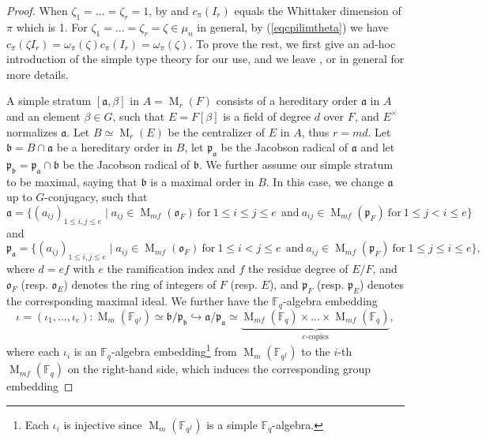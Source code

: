 \documentclass{amsart}
\numberwithin{equation}{section}
\newcommand{\mrm}{\operatorname{M}}
\newcommand{\mbf}{\mathbb{F}}
\newcommand{\mfp}{\mathfrak{p}}
\newcommand{\mfo}{\mathfrak{o}}
\newcommand{\mfa}{\mathfrak{a}}
\newcommand{\mfb}{\mathfrak{b}}
\begin{document}
		\begin{proof}
			
			When $\zeta_{1}=...=\zeta_{r}=1$, by \cite{rodier1975modele} and \cite{shalika1974multiplicity} $c_{\pi}(I_{r})$ equals the Whittaker dimension of $\pi$ which is 1. For $\zeta_{1}=...=\zeta_{r}=\zeta\in\mu_{n}$ in general, by (\ref{eqcpilimtheta}) we have $c_{\pi}(\zeta I_{r})=\omega_{\pi}(\zeta)c_{\pi}(I_{r})=\omega_{\pi}(\zeta)$. To prove the rest, we first give an ad-hoc introduction of the simple type theory for our use, and we leave \cite{bushnell2019arithmetic}, or in general \cite{bushnell129admissible} for more details.
			
			A simple stratum $[\mfa,\beta]$ in $A=\mrm_{r}(F)$ consists of a hereditary order $\mfa$ in $A$ and an element $\beta\in G$, such that $E=F[\beta]$ is a field of degree $d$ over $F$, and $E^{\times}$ normalizes $\mfa$. Let $B\simeq \mrm_{r}(E)$ be the centralizer of $E$ in $A$, thus $r=md$. Let $\mfb=B\cap\mfa$ be a hereditary order in $B$, let $\mfp_{\mfa}$ be the Jacobson radical of $\mfa$ and let $\mfp_{\mfb}=\mfp_{\mfa}\cap\mfb$ be the Jacobson radical of $\mfb$. We further assume our simple stratum to be maximal, saying that $\mfb$ is a maximal order in $B$. In this case, we change $\mfa$ up to $G$-conjugacy, such that $$\mfa=\{(a_{ij})_{1\leq i,j\leq e}\mid a_{ij}\in\mrm_{mf}(\mfo_{F})\ \text{for}\ 1\leq i\leq j\leq e\ \ \text{and}\ a_{ij}\in\mrm_{mf}(\mfp_{F})\ \text{for}\ 1\leq j< i\leq e \}$$
			and $$\mfp_{\mfa}=\{(a_{ij})_{1\leq i,j\leq e}\mid a_{ij}\in\mrm_{mf}(\mfo_{F})\ \text{for}\ 1\leq i< j\leq e\ \ \text{and}\ a_{ij}\in\mrm_{mf}(\mfp_{F})\ \text{for}\ 1\leq j\leq i\leq e \},$$ where $d=ef$ with $e$ the ramification index and $f$ the residue degree of $E/F$, and $\mfo_{F}$ (resp. $\mfo_{E}$) denotes the ring of integers of $F$ (resp. $E$), and $\mfp_{F}$ (resp. $\mfp_{E}$) denotes the corresponding maximal ideal. We further have the $\mbf_{q}$-algebra embedding
			\begin{equation}\label{eqiotaba}
				\iota=(\iota_{1},...,\iota_{e}):\mrm_{m}(\mbf_{q^{f}})\simeq\mfb/\mfp_{\mfb}\hookrightarrow\mfa/\mfp_{\mfa}\simeq\underbrace{\mrm_{mf}(\mbf_{q})\times...\times\mrm_{mf}(\mbf_{q})}_{e\text{-copies}},
			\end{equation}
			where each $\iota_{i}$ is an $\mbf_{q}$-algebra embedding\footnote{Each $\iota_{i}$ is injective since $\mrm_{m}(\mbf_{q^{f}})$ is a simple $\mbf_{q}$-algebra.} from $\mrm_{m}(\mbf_{q^{f}})$ to the $i$-th $\mrm_{mf}(\mbf_{q})$ on the right-hand side, which induces the corresponding group embedding 

\end{proof}
\end{document}
